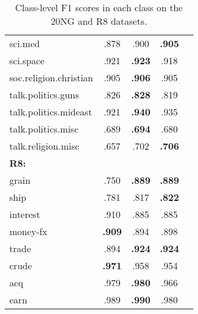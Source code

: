 \documentclass[11pt,a4paper]{article}
\begin{document}
\begin{table}[t]
{\begin{tabular}{l|cccc}
            \small{sci.med                 } &         .878  &         .900  & \textbf{.905} \\
            \small{sci.space               } &         .921  & \textbf{.923} &         .918  \\
            \small{soc.religion.christian  } &         .905  & \textbf{.906} &         .905  \\
            \small{talk.politics.guns      } &         .826  & \textbf{.828} &         .819  \\
            \small{talk.politics.mideast   } &         .921  & \textbf{.940} &         .935  \\
            \small{talk.politics.misc      } &         .689  & \textbf{.694} &         .680  \\
            \small{talk.religion.misc      } &         .657  &         .702  & \textbf{.706}  \\

            \hline
            \textbf{R8:}\\
            \small{grain   } &         .750  & \textbf{.889} & \textbf{.889} \\
            \small{ship    } &         .781  &         .817  & \textbf{.822} \\
            \small{interest} &         .910  &         .885  &         .885  \\
            \small{money-fx} & \textbf{.909} &         .894  &         .898  \\
            \small{trade   } &         .894  & \textbf{.924} & \textbf{.924} \\
            \small{crude   } & \textbf{.971} &         .958  &         .954 \\
            \small{acq     } &         .979  & \textbf{.980} &         .966 \\
            \small{earn    } &         .989  & \textbf{.990} &         .980 \\
        \end{tabular}
        }
        \caption{Class-level F1 scores in each class on the 20NG and R8 datasets.}
        \label{tb:class-level-results}
    \end{table}
\end{document}
